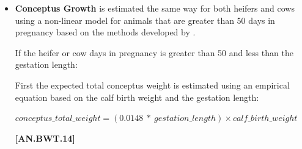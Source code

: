 \documentclass{article}
\begin{document}
\begin{refsection}
\begin{itemize}
\begin{center}
    \(target\_average\_daily\_gain = \frac{(1 - 0.92) × MSBW}{calving\_interval}\)
\end{center}
    \vspace{0.5cm}
    
    {\raggedleft \textbf{[AN.BWT.12]}\par}
    \vspace{0.5cm}
    
    \textbf{\textit{If pregnant:}}
    \vspace{0.5cm}
    
\begin{center}
    \(target\_average\_daily\_gain = \frac{(MSBW - bodyweight)}{gestation\_length - DIP}\)
\end{center}
    \vspace{0.5cm}
    
    {\raggedleft \textbf{[AN.BWT.13]}\par}
    \vspace{0.5cm}
    
The gestation length for cows is estimated with the same methods that are used for heifers and the calving interval is set either as the average herd calving interval or the animal’s own calving interval which is calculated as the age at her second calving minus her age at first calving as part of the daily\_reproduction\_update in animal.py.

    \item \textbf{Conceptus Growth} is estimated the same way for both heifers and cows using a non-linear model for animals that are greater than 50 days in pregnancy based on the methods developed by \textcite{Korver1985}. 
    \vspace{0.25cm}
    
    If the heifer or cow days in pregnancy is greater than 50  and less than the gestation length:

    First the expected total conceptus weight is estimated using an empirical equation based on the calf birth weight and the gestation length:
     \vspace{0.5cm}
     
\begin{center}
    \(conceptus\_total\_weight = (0.0148\ *\ gestation\_length) × calf\_birth\_weight\)
\end{center}
    \vspace{0.5cm}
    
    {\raggedleft \textbf{[AN.BWT.14]}\par}
    \vspace{0.5cm}
    

\end{itemize}
\end{refsection}
\end{document}
